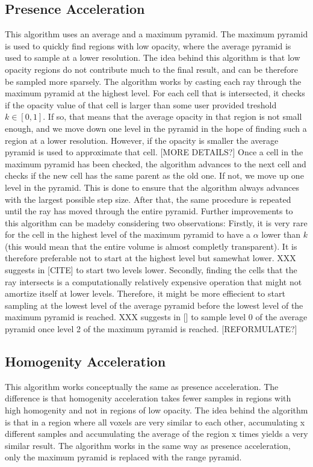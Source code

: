 {\subsection{Presence Acceleration}
This algorithm uses an average and a maximum pyramid. The maximum pyramid is used to quickly find regions with low opacity, where the average pyramid is used to sample at a lower resolution. The idea behind this algorithm is that low opacity regions do not contribute much to the final result, and can be therefore be sampled more sparsely.
The algorithm works by casting each ray through the maximum pyramid at the highest level. For each cell that is intersected, it checks if the opacity value of that cell is larger than some user provided treshold $k \in [0, 1]$.
If so, that means that the average opacity in that region is not small enough, and we move down one level in the pyramid in the hope of finding such a region at a lower resolution.
However, if the opacity is smaller the average pyramid is used to approximate that cell. [MORE DETAILS?]
Once a cell in the maximum pyramid has been checked, the algorithm advances to the next cell and checks if the new cell has the same parent as the old one. If not, we move up one level in the pyramid. This is done to ensure that the algorithm always advances with the largest possible step size.
After that, the same procedure is repeated until the ray has moved through the entire pyramid.
Further improvements to this algorithm can be madeby considering two observations:
Firstly, it is very rare for the cell in the highest level of the maximum pyramid to have a $\alpha$ lower than $k$ (this would mean that the entire volume is almost completly transparent). It is therefore preferable not to start at the highest level but samewhat lower. XXX suggests in [CITE] to start two levels lower.
Secondly, finding the cells that the ray intersects is a computationally relatively expensive operation that might not amortize itself at lower levels. Therefore, it might be more effiecient to start sampling at the lowest level of the average pyramid before the lowest level of the maximum pyramid is reached. XXX suggests in [] to sample level 0  of the average pyramid once level 2 of the maximum pyramid is reached. [REFORMULATE?]



\subsection{Homogenity Acceleration}
This algorithm works conceptually the same as presence acceleration. The difference is that homogenity acceleration takes fewer samples in regions with high homogenity and not in regions of low opacity. The idea behind the algorithm is that in a region where all voxels are very similar to each other, accumulating x different samples and accumulating the average of the region x times yields a very similar result. The algorithm works in the same way as presence acceleration, only the maximum pyramid is replaced with the range pyramid.
}
